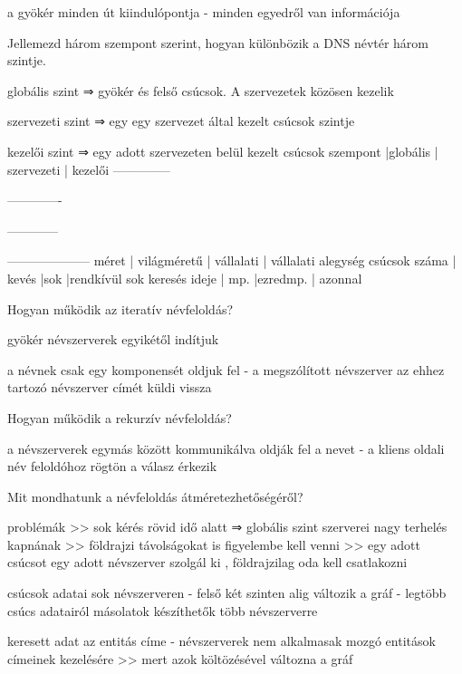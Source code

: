 \documentclass[twoside, a4paper, 12pt]{article}
\begin{document}
\begin{description}
        \item a gyökér minden út kiindulópontja
            - minden egyedről van információja
        \item  Jellemezd három szempont szerint, hogyan különbözik a DNS névtér három szintje.
        \item globális szint   ⇒ gyökér és felső csúcsok. A szervezetek közösen kezelik
        \item szervezeti szint ⇒ egy egy szervezet által kezelt csúcsok szintje
        \item kezelői szint    ⇒ egy adott szervezeten belül kezelt csúcsok
            szempont      |globális     | szervezeti | kezelői
            --------------\item-------------\item------------\item--------------------
            méret         | világméretű | vállalati  | vállalati alegység
            csúcsok száma | kevés       |sok         |rendkívül sok
            keresés ideje | mp.         |ezredmp.    | azonnal
        \item  Hogyan működik az iteratív névfeloldás?
        \item gyökér névszerverek egyikétől indítjuk
        \item a névnek csak egy komponensét oldjuk fel
            - a megszólított névszerver az ehhez tartozó névszerver címét küldi vissza
        \item  Hogyan működik a rekurzív névfeloldás?
        \item a névszerverek egymás között kommunikálva oldják fel a nevet
            - a kliens oldali név feloldóhoz rögtön a válasz érkezik
        \item  Mit mondhatunk a névfeloldás átméretezhetőségéről?
        \item problémák 
            >> sok kérés rövid idő alatt ⇒ globális szint szerverei nagy terhelés kapnának
            >> földrajzi távolságokat is figyelembe kell venni
            >> egy adott csúcsot egy adott névszerver szolgál ki , földrajzilag oda kell csatlakozni
        \item csúcsok adatai sok névszerveren
            - felső két szinten alig változik a gráf
            - legtöbb csúcs adatairól másolatok készíthetők több névszerverre
        \item keresett adat az entitás címe
            - névszerverek nem alkalmasak mozgó entitások címeinek kezelésére >>  mert azok költözésével változna a gráf

\end{description}
\end{document}
